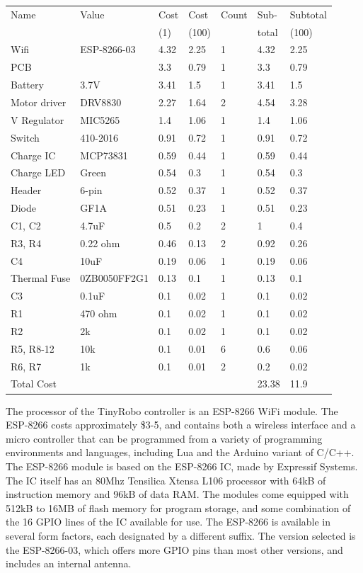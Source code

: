\documentclass[]{article}
\begin{document}
 \begin{table}
	\begin{tabular}{l l l l l l l }
	Name & Value & Cost & Cost & Count & Sub- & Subtotal\\
	& & (1) & (100) & & total& (100) \\
	\hline
	Wifi& ESP-8266-03& 4.32 & 2.25 & 1 & 4.32 & 2.25\\
	PCB& & 3.3 & 0.79 & 1 & 3.3 & 0.79\\
	Battery& 3.7V& 3.41 & 1.5 & 1 & 3.41 & 1.5\\
	Motor driver& DRV8830& 2.27 & 1.64 & 2 & 4.54 & 3.28\\
	V Regulator& MIC5265& 1.4 & 1.06 & 1 & 1.4 & 1.06\\
	Switch& 410-2016& 0.91 & 0.72 & 1 & 0.91 & 0.72\\
	Charge IC& MCP73831& 0.59 & 0.44 & 1 & 0.59 & 0.44\\
	Charge LED& Green& 0.54 & 0.3 & 1 & 0.54 & 0.3\\
	Header& 6-pin& 0.52 & 0.37 & 1 & 0.52 & 0.37\\
	Diode& GF1A & 0.51& 0.23 & 1 & 0.51 & 0.23\\
	C1, C2& 4.7uF& 0.5 & 0.2 & 2 & 1 & 0.4\\
	R3, R4& 0.22 ohm& 0.46 & 0.13 & 2 & 0.92 & 0.26\\
	C4& 10uF& 0.19 & 0.06 & 1 & 0.19 & 0.06\\
	Thermal Fuse& 0ZB0050FF2G1& 0.13 & 0.1 & 1 & 0.13 & 0.1\\
	C3& 0.1uF& 0.1 & 0.02 & 1 & 0.1 & 0.02\\
	R1& 470 ohm& 0.1 & 0.02 & 1 & 0.1 & 0.02\\
	R2& 2k & 0.1& 0.02 & 1 & 0.1 & 0.02\\
	R5, R8-12& 10k& 0.1 & 0.01 & 6 & 0.6 & 0.06\\
	R6, R7& 1k& 0.1 & 0.01 & 2 & 0.2 & 0.02\\
	\hline
	Total Cost &  &  &  &  & 23.38 & 11.9\\
 	\end{tabular}
 \end{table}
 
The processor of the TinyRobo controller is an ESP-8266 WiFi module.
The ESP-8266 costs approximately \$3-5, and contains both a wireless interface and a micro controller that can be programmed from a variety of programming environments and languages, including Lua and the Arduino variant of C/C++. The ESP-8266 module is based on the ESP-8266 IC, made by Expressif Systems. The IC itself has an 80Mhz Tensilica Xtensa L106 processor with 64kB of instruction memory and 96kB of data RAM. The modules come equipped with 512kB to 16MB of flash memory for program storage, and some combination of the 16 GPIO lines of the IC available for use. 
The ESP-8266 is available in several form factors, each designated by a different suffix. 
The version selected is the ESP-8266-03, which offers more GPIO pins than most other versions, and includes an internal antenna.
\end{document}
